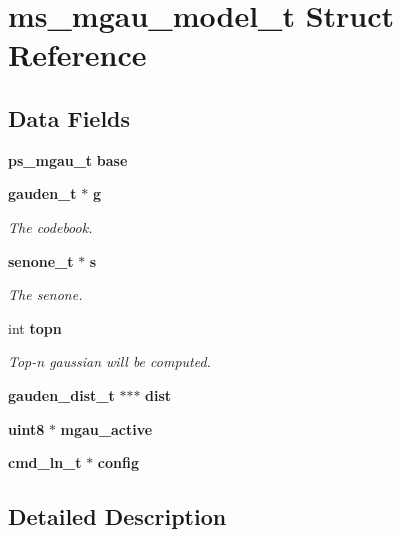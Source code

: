 \section{ms\-\_\-mgau\-\_\-model\-\_\-t \-Struct \-Reference}
\label{structms__mgau__model__t}
\subsection*{\-Data \-Fields}
\begin{DoxyCompactItemize}
\item 
{\bf ps\-\_\-mgau\-\_\-t} {\bfseries base}\label{structms__mgau__model__t_a7cf0c4a3c033912a8ab28eb5924fb892}

\item 
{\bf gauden\-\_\-t} $\ast$ {\bf g}\label{structms__mgau__model__t_a91027cdb757280ac557668068e6f1b07}

\begin{DoxyCompactList}\small\item\em \-The codebook. \end{DoxyCompactList}\item 
{\bf senone\-\_\-t} $\ast$ {\bf s}\label{structms__mgau__model__t_a551527ce9cd5702d854a1a5600122985}

\begin{DoxyCompactList}\small\item\em \-The senone. \end{DoxyCompactList}\item 
int {\bf topn}
\begin{DoxyCompactList}\small\item\em \-Top-\/n gaussian will be computed. \end{DoxyCompactList}\item 
{\bf gauden\-\_\-dist\-\_\-t} $\ast$$\ast$$\ast$ {\bfseries dist}\label{structms__mgau__model__t_a07276348bcc1352e45ce61201112fbfa}

\item 
{\bf uint8} $\ast$ {\bfseries mgau\-\_\-active}\label{structms__mgau__model__t_a1b012fcae279fb82fbb8ec2c11570e89}

\item 
{\bf cmd\-\_\-ln\-\_\-t} $\ast$ {\bfseries config}\label{structms__mgau__model__t_a7ce63c2b0f68a738da9bd3c137c8d0a5}

\end{DoxyCompactItemize}


\subsection{\-Detailed \-Description}


